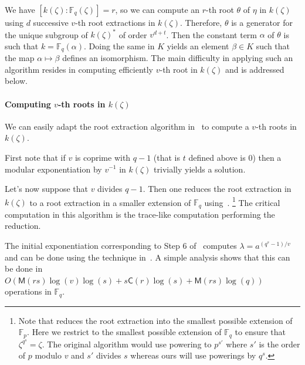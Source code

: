 \documentclass[12pt]{article}
\theoremstyle{plain}
\theoremstyle{definition}
\def\F{\ensuremath{\mathbb{F}}}
\def\MM{\ensuremath{\mathsf{M}}}
\def\CC{\ensuremath{\mathsf{C}}}
\newcounter{algorithm}
\begin{document}
We have $[k(\zeta): \F_q(\zeta)] = r$, so we can 
compute an $r$-th root $\theta$ of $\eta$ in $k(\zeta)$ using $d$ successive $v$-th 
root extractions in $k(\zeta)$. Therefore, $\theta$ is a generator for the unique subgroup of 
$k(\zeta)^*$ of order $v^{d + t}$. Then the constant term $\alpha$ of $\theta$ is such that $k = 
\F_q(\alpha)$. %
Doing the same in $K$ yields an element $\beta\in K$ such that
the map $\alpha\mapsto\beta$ defines an isomorphism. %
The main difficulty in applying such an algorithm resides in computing
efficiently $v$-th root in $k(\zeta)$ and is addressed below.


\paragraph{Computing $v$-th roots in $k(\zeta)$}
We can easily adapt the root extraction algorithm in~\cite{doliskanischost2011} to compute a $v$-th 
roots in $k(\zeta)$.

First note that if $v$ is coprime with $q-1$ (that is $t$ defined above is $0$)  then a modular exponentiation by $v^{-1}$ in $k(\zeta)$ trivially yields a solution.

Let's now suppose that $v$ divides $q-1$.
Then one reduces the root extraction in $k(\zeta)$ to a root extraction
in a smaller extension of $\F_q$ using~\cite[Algorithm~3]{doliskanischost2011}.%
\footnote{Note that \cite[Algorithm~3]{doliskanischost2011} reduces the
root extraction into the smallest possible extension of $\F_p$.
Here we restrict to the smallest possible extension of $\F_q$
to ensure that $\zeta^{q^s} = \zeta$.
The original algorithm would use powering to $p^{s'}$
where $s'$ is the order of $p$ modulo $v$ and $s'$ divides $s$
whereas ours will use powerings by $q^s$.}
The critical computation in this algorithm is the trace-like computation performing the reduction.

The initial exponentiation corresponding to Step 6 of~\cite[Algorithm~3]{doliskanischost2011}
computes $\lambda = a^{(q^s - 1)/v}$
and can be done using the technique
in~\cite[Lemma~14]{shoup94}.
A simple analysis shows that this can be done in $O(\MM(rs)\log(v)\log(s) + 
s\CC(r)\log(s) + \MM(rs)\log(q))$ operations in $\F_q$.
\end{document}
